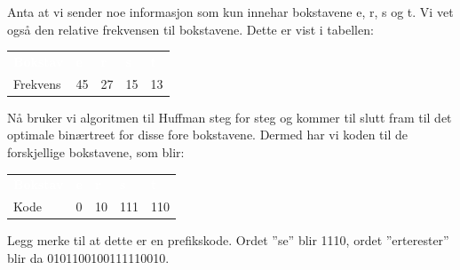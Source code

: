 \begin{boxed}
Anta at vi sender noe informasjon som kun innehar bokstavene e, r, s og t. Vi vet også den relative frekvensen til bokstavene. Dette er vist i tabellen:
\begin{table}[H]
    \label{tab:huffman1}
    \centering
    \begin{tabular}{|L{5em} |L{5em}|L{5em}|L{5em}|L{5em}|}
        \hline
        \textbf{\textcolor{white}{Bokstav}} & \textbf{\textcolor{white}{e}} & \textbf{\textcolor{white}{r}} & \textbf{\textcolor{white}{s}} & \textbf{\textcolor{white}{t}}\\
        Frekvens & 45 & 27 & 15 & 13\\
         \hline
    \end{tabular}
\end{table}
Nå bruker vi algoritmen til Huffman steg for steg og kommer til slutt fram til det optimale binærtreet for disse fore bokstavene. Dermed har vi koden til de forskjellige bokstavene, som blir:
\begin{table}[H]
    \label{tab:huffman1}
    \centering
    \begin{tabular}{|L{5em} |L{5em}|L{5em}|L{5em}|L{5em}|}
        \hline
        \textbf{\textcolor{white}{Bokstav}} & \textbf{\textcolor{white}{e}} & \textbf{\textcolor{white}{r}} & \textbf{\textcolor{white}{s}} & \textbf{\textcolor{white}{t}}\\
        Kode & 0 & 10 & 111 & 110\\
         \hline
    \end{tabular}
\end{table}
Legg merke til at dette er en prefikskode. Ordet ''se'' blir 1110, ordet ''erterester'' blir da 0101100100111110010.


\end{boxed}
